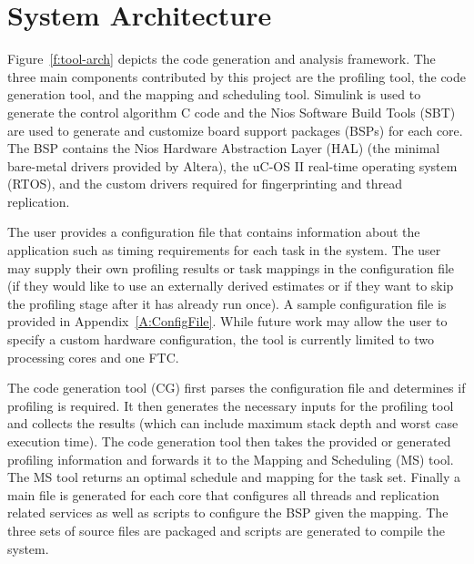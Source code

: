 
\chapter{System Architecture} %

\label{c:tool-arch} %

	Figure~\ref{f:tool-arch} depicts the code generation and analysis framework. 
	The three main components contributed by this project are the profiling tool, the code generation tool, and the mapping and scheduling tool. 
	Simulink is used to generate the control algorithm C code and the Nios Software Build Tools (SBT) are used to generate and customize board support packages (BSPs) for each core. 
	The BSP contains the Nios Hardware Abstraction Layer (HAL) (the minimal bare-metal drivers provided by Altera), the uC-OS II real-time operating system (RTOS), and the custom drivers required for fingerprinting and thread replication. 

 
	The user provides a configuration file that contains information about the application such as timing requirements for each task in the system. 
	The user may supply their own profiling results or task mappings in the configuration file (if they would like to use an externally derived estimates or if they want to skip the profiling stage after it has already run once). 
	A sample configuration file is provided in Appendix~\ref{A:ConfigFile}. 
	While future work may allow the user to specify a custom hardware configuration, the tool is currently limited to two processing cores and one FTC. 


	The code generation tool (CG) first parses the configuration file and determines if profiling is required. 
	It then generates the necessary inputs for the profiling tool and collects the results (which can include maximum stack depth and worst case execution time). 
	The code generation tool then takes the provided or generated profiling information and forwards it to the Mapping and Scheduling (MS) tool. 
	The MS tool returns an optimal schedule and mapping for the task set. 
	Finally a main file is generated for each core that configures all threads and replication related services as well as scripts to configure the BSP given the mapping. 	The three sets of source files are packaged and scripts are generated to compile the system.